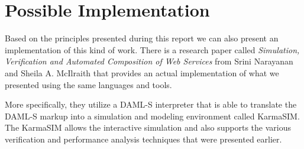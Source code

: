 \section*{Possible Implementation}
Based on the principles presented during this report we can also present an implementation of this kind of work. There is a research paper called \emph{Simulation, Verification and Automated Composition of Web Services} from Srini Narayanan and Sheila A. McIlraith that provides an actual implementation of what we presented using the same languages and tools.

More specifically, they utilize a DAML-S interpreter that is able to translate the DAML-S markup into a simulation and modeling environment called KarmaSIM. The KarmaSIM allows the interactive simulation and also supports the various verification and performance analysis techniques that were presented earlier.